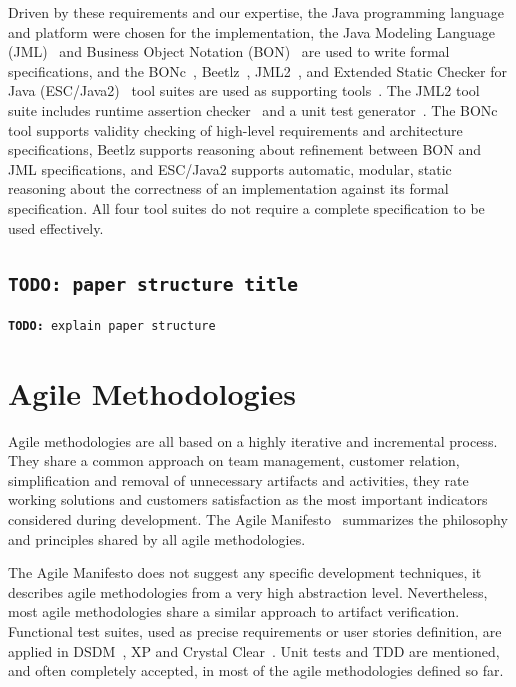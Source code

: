 \documentclass[english]{lni}
\newcommand{\todo}[1]{\texttt{\textbf{TODO:} #1}}
\begin{document}
Driven by these requirements and our expertise, the Java programming
language and platform were chosen for the implementation, the Java
Modeling Language (JML)~\cite{LeavensBakerRuby-Prelim} and Business
Object Notation (BON)~\cite{WaldenNerson95} are used to write formal
specifications, and the BONc~\cite{BONc}, Beetlz~\cite{Beetlz},
JML2~\cite{JML2,JML2common}, and Extended Static Checker for Java
(ESC/Java2)~\cite{ESCJava2,KiniryCok04SmallCite} tool suites are used
as supporting tools~\cite{BurdyEtal05-STTT}.  The JML2 tool suite
includes runtime assertion checker~\cite{Cheon-Leavens02b} and a unit
test generator~\cite{Cheon2002}.  The BONc tool supports validity
checking of high-level requirements and architecture specifications,
Beetlz supports reasoning about refinement between BON and JML
specifications, and ESC/Java2 supports automatic, modular, static
reasoning about the correctness of an implementation against its
formal specification.  All four tool suites do not require a complete
specification to be used effectively.

\subsection{\todo{paper structure title}}

\todo{explain paper structure}



\section{Agile Methodologies}
\label{sec:agile_methodologies}

Agile methodologies are all based on a highly iterative and incremental process.
They share a common approach on team management, customer relation, simplification and removal of unnecessary artifacts and activities, they rate working solutions and customers satisfaction as the most important indicators considered during development.
The Agile Manifesto~\cite{Beck2001} summarizes the philosophy and principles shared by all agile methodologies.

The Agile Manifesto does not suggest any specific development techniques, it describes agile methodologies from a very high abstraction level.
Nevertheless, most agile methodologies share a similar approach to artifact verification.
Functional test suites, used as precise requirements or user stories definition, are applied in DSDM~\cite{Stapleton1997}, XP and Crystal Clear~\cite{Cockburn2004}. 
Unit tests and TDD are mentioned, and often completely accepted, in most of the agile methodologies defined so far.
\end{document}
